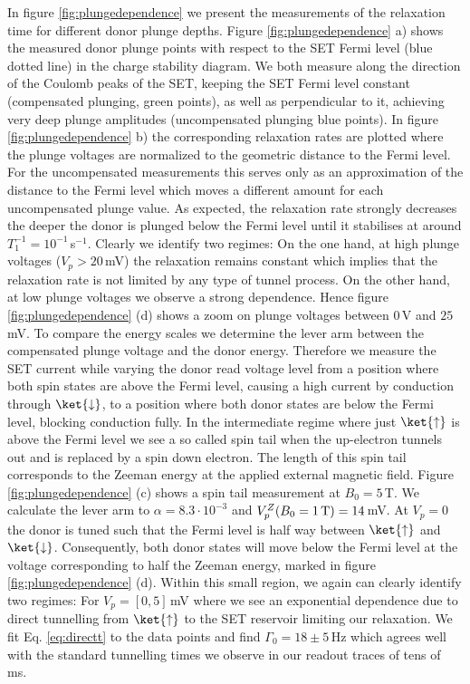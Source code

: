 In figure \ref{fig:plungedependence} we present the measurements of the relaxation time for different donor plunge depths. Figure \ref{fig:plungedependence} a) shows the measured donor plunge points with respect to the SET Fermi level (blue dotted line) in the charge stability diagram. We both measure along the direction of the Coulomb peaks of the SET, keeping the SET Fermi level constant (compensated plunging, green points), as well as perpendicular to it, achieving very deep plunge amplitudes (uncompensated plunging blue points). In figure \ref{fig:plungedependence} b) the corresponding relaxation rates are plotted where the plunge voltages are normalized to the geometric distance to the Fermi level. For the uncompensated measurements this serves only as an approximation of the distance to the Fermi level which moves a different amount for each uncompensated plunge value. 
As expected, the relaxation rate strongly decreases the deeper the donor is plunged below the Fermi level until it stabilises at around $T_1^{-1}=10^{-1}\,$s$^{-1}$. Clearly we identify two regimes: On the one hand, at high plunge voltages ($V_p>20\,$mV) the relaxation remains constant which implies that the relaxation rate is not limited by any type of tunnel process. On the other hand, at low plunge voltages we observe a strong dependence. Hence figure \ref{fig:plungedependence} (d) shows a zoom on plunge voltages between $0\,$V and $25\,$mV. 
To compare the energy scales we determine the lever arm between the compensated plunge voltage and the donor energy. Therefore we measure the SET current while varying the donor read voltage level from a position where both spin states are above the Fermi level, causing a high current by conduction through $\ket{\downarrow}$, to a position where both donor states are below the Fermi level, blocking conduction fully. In the intermediate regime where just $\ket{\uparrow}$ is above the Fermi level we see a so called spin tail when the up-electron tunnels out and is replaced by a spin down electron. The length of this spin tail corresponds to the Zeeman energy at the applied external magnetic field. Figure \ref{fig:plungedependence} (c) shows a spin tail measurement at $B_0=5\,$T. We calculate the lever arm to $\alpha=8.3\cdot 10^{-3}$ and $V_p^{Z}(B_0=1\,\rm{T})=14\,$mV. At $V_p=0$ the donor is tuned such that the Fermi level is half way between $\ket{\uparrow}$ and $\ket{\downarrow}$. Consequently, both donor states will move below the Fermi level at the voltage corresponding to half the Zeeman energy, marked in figure \ref{fig:plungedependence} (d). Within this small region, we again can clearly identify two regimes: For $V_p=[0,5]\,$mV where we see an exponential dependence due to direct tunnelling from $\ket{\uparrow}$ to the SET reservoir limiting our relaxation. We fit Eq. \eqref{eq:directt} to the data points and find $\Gamma_0=18\pm5\,$Hz which agrees well with the standard tunnelling times we observe in our readout traces of tens of ms. 


